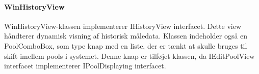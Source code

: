 \paragraph {WinHistoryView}
WinHistoryView-klassen implementerer IHistoryView interfacet. Dette view håndterer dynamisk visning af historisk måledata.
Klassen indeholder også en PoolComboBox, som type knap med en liste, der er tænkt at skulle bruges til skift imellem pools i systemet. Denne knap er tilføjet klassen, da IEditPoolView interfacet implementerer IPoolDisplaying interfacet. 